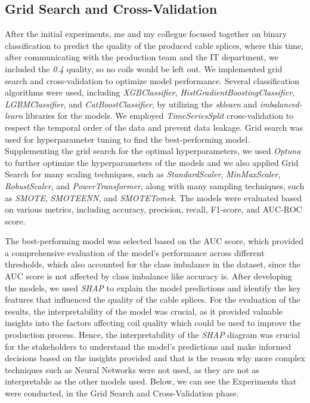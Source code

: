 \subsection{Grid Search and Cross-Validation}

After the initial experiments, me and my collegue focused together on binary
classification to predict the quality of the produced cable splices, where this
time, after communicating with the production team and the IT department, we
included the \emph{0.4} quality, so no coils would be left out. We implemented
grid search and cross-validation to optimize model performance. Several
classification algorithms were used, including \emph{XGBClassifier},
\emph{HistGradientBoostingClassifier}, \emph{LGBMClassifier}, and
\emph{CatBoostClassifier}, by utilizing the \emph{sklearn} and
\emph{imbalanced-learn} libraries for the models. We employed
\emph{TimeSeriesSplit} cross-validation to respect the temporal order of the
data and prevent data leakage. Grid search was used for hyperparameter tuning
to find the best-performing model. Supplementing the grid search for the
optimal hyperparameters, we used \emph{Optuna} to further optimize the
hyperparameters of the models and we also applied Grid Search for many scaling
techniques, such as \emph{StandardScaler}, \emph{MinMaxScaler},
\emph{RobustScaler}, and \emph{PowerTransformer}, along with many sampling
techniques, such as \emph{SMOTE}, \emph{SMOTEENN}, and \emph{SMOTETomek}. The
models were evaluated based on various metrics, including accuracy, precision,
recall, F1-score, and AUC-ROC score.

The best-performing model was selected based on the AUC score, which provided a
comprehensive evaluation of the model's performance across different
thresholds, which also accounted for the class imbalance in the dataset, since
the AUC score is not affected by class imbalance like accuracy is. After
developing the models, we used \emph{SHAP} to explain the model predictions and
identify the key features that influenced the quality of the cable splices. For
the evaluation of the results, the interpretability of the model was crucial,
as it provided valuable insights into the factors affecting coil quality which
could be used to improve the production process. Hence, the interpretability of
the \emph{SHAP} diagram was crucial for the stakeholders to understand the
model's predictions and make informed decisions based on the insights provided
and that is the reason why more complex techniques such as Neural Networks were
not used, as they are not as interpretable as the other models used. Below, we
can see the Experiments that were conducted, in the Grid Search and
Cross-Validation phase.

